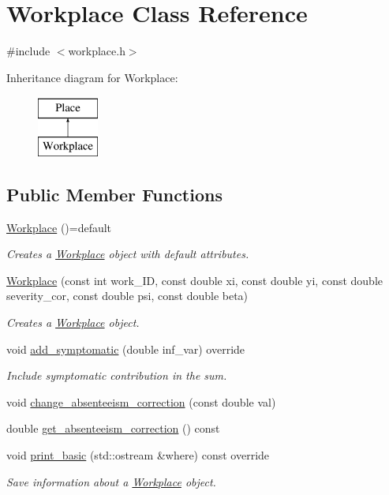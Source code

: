 \hypertarget{classWorkplace}{}\section{Workplace Class Reference}
\label{classWorkplace}


{\ttfamily \#include $<$workplace.\+h$>$}

Inheritance diagram for Workplace\+:\begin{figure}[H]
\begin{center}
\leavevmode
\includegraphics[height=2.000000cm]{classWorkplace}
\end{center}
\end{figure}
\subsection*{Public Member Functions}
\begin{DoxyCompactItemize}
\item 
\hyperlink{classWorkplace_af182fb46622e45e1c45cec7ab5c3a3c1}{Workplace} ()=default
\begin{DoxyCompactList}\small\item\em Creates a \hyperlink{classWorkplace}{Workplace} object with default attributes. \end{DoxyCompactList}\item 
\hyperlink{classWorkplace_a0d116e1103d53e5417c295eebcfc7f39}{Workplace} (const int work\+\_\+\+ID, const double xi, const double yi, const double severity\+\_\+cor, const double psi, const double beta)
\begin{DoxyCompactList}\small\item\em Creates a \hyperlink{classWorkplace}{Workplace} object. \end{DoxyCompactList}\item 
void \hyperlink{classWorkplace_a48ef6cf8af0753240063ea8c00f4cc63}{add\+\_\+symptomatic} (double inf\+\_\+var) override
\begin{DoxyCompactList}\small\item\em Include symptomatic contribution in the sum. \end{DoxyCompactList}\item 
void \hyperlink{classWorkplace_a0d601f969c1403a8c51e1e940a9ed6c8}{change\+\_\+absenteeism\+\_\+correction} (const double val)
\item 
double \hyperlink{classWorkplace_a8ea81599e58cc96e4cf7c1e536e3b9d7}{get\+\_\+absenteeism\+\_\+correction} () const
\item 
void \hyperlink{classWorkplace_af4fcc642e32e174bab45def56b7c6f05}{print\+\_\+basic} (std\+::ostream \&where) const override
\begin{DoxyCompactList}\small\item\em Save information about a \hyperlink{classWorkplace}{Workplace} object. \end{DoxyCompactList}\end{DoxyCompactItemize}
